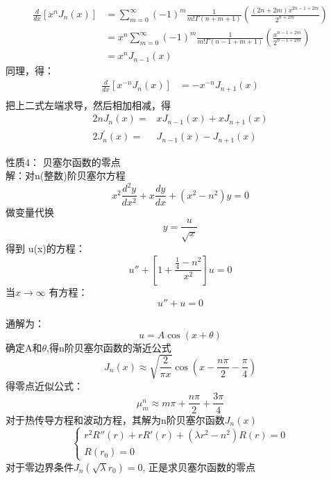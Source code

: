 \begin{frame}
	\begin{equation*}
		\begin{split}
			\frac{d}{dx} [x^n J_n(x)] &=\sum\limits_{m=0}^{\infty} (-1)^m  
			\frac{1}{m! \Gamma(n+m+1) } (\frac{(2n+2m)x^{2n-1+2m}}{2^{n+2m}})\\
			&=x^n\sum\limits_{m=0}^{\infty} (-1)^m  
			\frac{1}{m! \Gamma(n-1+m+1) } (\frac{x^{n-1+2m}}{2^{n-1+2m}})\\ 
			&=x^n J_{n-1}(x)
		\end{split}
	\end{equation*}	
	同理，得：
	\begin{equation*}
		\begin{split}
		\frac{d}{d x}\left[x^{-n} J_{n}(x)\right]&=-x^{-n} J_{n+1}(x) \\
		\end{split}
	\end{equation*}	 
	把上二式左端求导，然后相加相减，得
	\begin{equation*}
		\begin{split}
		2 n J_{n}(x)=&x J_{n-1}(x)+x J_{n+1}(x) \\
		2 J_{n}^{\prime}(x)=&J_{n-1}(x)-J_{n+1}(x)
		\end{split}
	\end{equation*}	 	
\end{frame}

\begin{frame}
	\alert{性质4：} 贝塞尔函数的零点\\
	\alert{解：}对n(整数)阶贝塞尔方程
	\begin{equation*}
		x^2\frac{d^2y}{dx^2} + x\frac{dy}{dx} +(x^2 -n^2)y=0
	\end{equation*}
	做变量代换 \[ y=\frac{u}{\sqrt{x}}\] 
	得到 u(x)的方程：
	\begin{equation*}
		u'' +[1+\frac{\frac{1}{4}-n^2}{x^2}] u=0
	\end{equation*}
	当$x \to \infty $ 有方程：
	\begin{equation*}
		u'' + u=0 
	\end{equation*}	
\end{frame}	

\begin{frame}
	通解为：\[u=A\cos(x+\theta)\]
	确定A和$\theta$,得n阶贝塞尔函数的渐近公式\\
	\begin{equation*}
		J_{n}(x) \approx \sqrt{\frac{2}{\pi x}} \cos \left(x-\frac{n \pi}{2}-\frac{\pi}{4}\right)
	\end{equation*}
	得零点近似公式：
	\begin{equation*}
		\mu_{m}^{n} \approx m \pi+\frac{n \pi}{2}+\frac{3 \pi}{4}
	\end{equation*}
	对于热传导方程和波动方程，其解为n阶贝塞尔函数$J_n(x)$
	\[\begin{cases}
		r^2 R'' (r)+r R'(r) +( \lambda r^2 -n^2)R(r)=0  \\
		R(r_0)=0
	\end{cases}  \]
	对于零边界条件$J_n(\sqrt{\lambda}r_0)=0$, 正是求贝塞尔函数的零点
\end{frame}	

